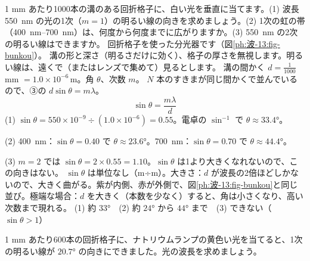 \begin{phreidai}[回折格子で白い光を分ける]
\label{ph:波-13:ex3}1 mm あたり1000本の溝のある回折格子に、白い光を垂直に当てます。(1) 波長 \qty{550}{nm} の光の1次（$m=1$）の明るい線の向きを求めましょう。(2) 1次の虹の帯（\qtyrange{400}{700}{nm}）は、何度から何度までに広がりますか。(3) \qty{550}{nm} の2次の明るい線はできますか。
\phbamen
回折格子を使った分光器です（図\ref{ph:波-13:fig-bunkou}）。
\phmushi
溝の形と深さ（明るさだけに効く）、格子の厚さを無視します。明るい線は、遠くで（またはレンズで集めて）見るとします。
\phzu
溝の間かく $d=\tfrac{1}{1000}$\,mm $=1.0\times10^{-6}$\,m。角 $\theta$、次数 $m$。
\phriyu
$N$ 本のすきまが同じ間かくで並んでいるので、③の $d\sin\theta=m\lambda$。
\phtateru
\[ \sin\theta=\frac{m\lambda}{d} \]
\phtoku
(1) $\sin\theta=550\times10^{-9}\div(1.0\times10^{-6})=0.55$。電卓の $\sin^{-1}$ で $\theta\approx33.4°$。\par
(2) \qty{400}{nm}：$\sin\theta=0.40$ で $\theta\approx23.6°$。\qty{700}{nm}：$\sin\theta=0.70$ で $\theta\approx44.4°$。\par
(3) $m=2$ では $\sin\theta=2\times0.55=1.10$。$\sin\theta$ は1より大きくなれないので、この向きはない。
\phtashikame
$\sin\theta$ は単位なし（m÷m）。大きさ：$d$ が波長の2倍ほどしかないので、大きく曲がる。紫が内側、赤が外側で、図\ref{ph:波-13:fig-bunkou}と同じ並び。極端な場合：$d$ を大きく（本数を少なく）すると、角は小さくなり、高い次数まで現れる。
\kotae (1) 約 $33°$　(2) 約 $24°$ から $44°$ まで　(3) できない（$\sin\theta>1$）
\end{phreidai}
\begin{jibun}
1 mm あたり600本の回折格子に、ナトリウムランプの黄色い光を当てると、1次の明るい線が $20.7°$ の向きにできました。光の波長を求めましょう。
\end{jibun}

